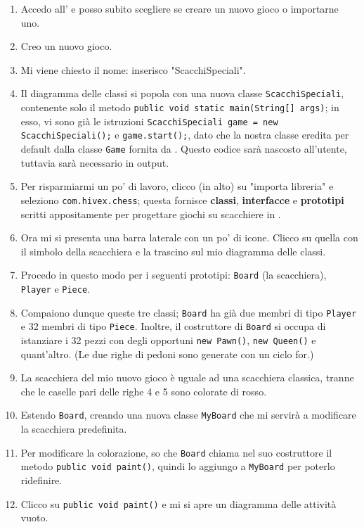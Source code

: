 \begin{enumerate}
	\item Accedo all' e posso subito scegliere se creare un nuovo gioco o importarne uno.
	\item Creo un nuovo gioco.
	\item Mi viene chiesto il nome: inserisco "ScacchiSpeciali".
	\item Il diagramma delle classi si popola con una nuova classe \texttt{ScacchiSpeciali}, contenente solo il metodo \texttt{public void static main(String[] args)}; in esso, vi sono già le istruzioni \texttt{ScacchiSpeciali game = new ScacchiSpeciali();} e \texttt{game.start();}, dato che la nostra classe eredita per default dalla classe \texttt{Game} fornita da \proj. Questo codice sarà nascosto all'utente, tuttavia sarà necessario in output.
	\item Per risparmiarmi un po' di lavoro, clicco (in alto) su "importa libreria" e seleziono \texttt{com.hivex.chess}; questa fornisce \textbf{classi}, \textbf{interfacce} e \textbf{prototipi} scritti appositamente per progettare giochi su scacchiere in \proj.
	\item Ora mi si presenta una barra laterale con un po' di icone. Clicco su quella con il simbolo della scacchiera e la trascino sul mio diagramma delle classi.
	\item Procedo in questo modo per i seguenti prototipi: \texttt{Board} (la scacchiera), \texttt{Player} e \texttt{Piece}.
	\item Compaiono dunque queste tre classi; \texttt{Board} ha già due membri di tipo \texttt{Player} e 32 membri di tipo \texttt{Piece}. Inoltre, il costruttore di \texttt{Board} si occupa di istanziare i 32 pezzi con degli opportuni \texttt{new Pawn()}, \texttt{new Queen()} e quant'altro. (Le due righe di pedoni sono generate con un ciclo for.)
	\item La scacchiera del mio nuovo gioco è uguale ad una scacchiera classica, tranne che le caselle pari delle righe 4 e 5 sono colorate di rosso.
	\item Estendo \texttt{Board}, creando una nuova classe \texttt{MyBoard} che mi servirà a modificare la scacchiera predefinita.
	\item Per modificare la colorazione, so che \texttt{Board} chiama nel suo costruttore il metodo \texttt{public void paint()}, quindi lo aggiungo a \texttt{MyBoard} per poterlo ridefinire.
	\item Clicco su \texttt{public void paint()} e mi si apre un diagramma delle attività vuoto.

\end{enumerate}
